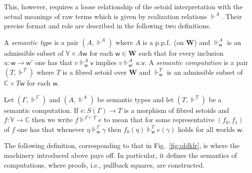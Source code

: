 \documentclass[orivec]{llncs}
\newcommand\w{\ensuremath{\mathsf{w}}\xspace}
\newcommand{\world}{\ensuremath{\mathbf{W}}\xspace}
\newcommand{\Values}{\mathbb{V}}
\newcommand{\Comps}{\mathbb{C}}
\newcommand\val{\ensuremath{\mathsf{v}}\xspace}
\newcommand\vval{\ensuremath{v}\xspace}
\begin{document}
This, however, requires a loose relationship of the setoid interpretation
with the actual meanings of raw terms which is given by realization
relations $\Vdash^A$. Their precise format and role are described in the
following two  definitions. 
\begin{definition}\label{defte}
  A \emph{semantic type} is a pair $(A,\Vdash^A)$ where $A$ is a
  p.p.f.\ (on $\world$) and $\Vdash^A_\w$ is an admissible
  subset of $\Values\times A\w$ for each $\w\in \world$ such that for
  every inclusion $u:\w\rightarrow \w'$ one has that $\vval\Vdash^A_\w
  \val$ implies $\vval\Vdash^A_{\w'} u.\val$.  A \emph{semantic
computation} is a pair $(T,\Vdash^T)$ where $T$ is
  a fibred setoid over $\world$ and $\Vdash_\w^T$ is an
  admissible subset of $\Comps\times T\w$ for each $\w$.
\end{definition}
\begin{definition}
  Let $(\Gamma,\Vdash^\Gamma)$ and $(A,\Vdash^A)$ be semantic types
  and let $(T,\Vdash^T)$ be a semantic computation.  If
  $e:S(\Gamma)\rightarrow T$ is a morphism of fibred setoids and
  $f:\Values\rightarrow \Comps$ then we write $f\Vdash^{\Gamma\vdash
    T}e$ to mean that for some representative $(f_0,f_1)$ of $f$ one has that 
 whenever $\eta\Vdash^\Gamma_\w \gamma$ then
  $f_0(\eta)\Vdash^T_\w e(\gamma)$ holds for all worlds $\w$.
\end{definition}

The following definition, corresponding to that in Fig.~\ref{fig:oldklr}, is where the machinery introduced above pays off.
In particular, it defines the semantics of computations, where proofs,
i.e., pullback squares, are constructed. 
\end{document}
